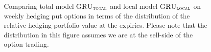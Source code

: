 \documentclass[letterpaper,12pt,titlepage,oneside,final]{book}
\numberwithin{equation}{section}
\theoremstyle{definition}
\newcommand{\modelT}{\textsc{GRU}_{\textsc{total}}}
\newcommand{\modelL}{\textsc{GRU}_{\textsc{local}}}
\begin{document}
\begin{figure}[htp!]
	\centering
	
	\caption{Comparing total model $\modelT$ and local model $\modelL$ on weekly hedging put options in terms of the distribution of the  relative hedging portfolio value at the expiries. Please note that the distribution in this figure assumes we are at the sell-side of the option trading.} \label{fig:putTotalW1}
	\centering

\end{figure}
\end{document}
